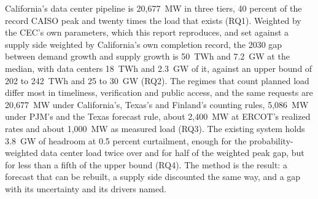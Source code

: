 California's data center pipeline is 20,677~MW in three tiers, 40 percent of the record CAISO peak and twenty times the load that exists (RQ1). Weighted by the CEC's own parameters, which this report reproduces, and set against a supply side weighted by California's own completion record, the 2030 gap between demand growth and supply growth is 50~TWh and 7.2~GW at the median, with data centers 18~TWh and 2.3~GW of it, against an upper bound of 202 to 242~TWh and 25 to 30~GW (RQ2). The regimes that count planned load differ most in timeliness, verification and public access, and the same requests are 20,677~MW under California's, Texas's and Finland's counting rules, 5,086~MW under PJM's and the Texas forecast rule, about 2,400~MW at ERCOT's realized rates and about 1,000~MW as measured load (RQ3). The existing system holds 3.8~GW of headroom at 0.5 percent curtailment, enough for the probability-weighted data center load twice over and for half of the weighted peak gap, but for less than a fifth of the upper bound (RQ4). The method is the result: a forecast that can be rebuilt, a supply side discounted the same way, and a gap with its uncertainty and its drivers named.
